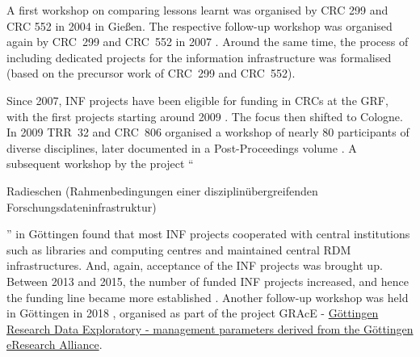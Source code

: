 \documentclass{eceasst}
\newenvironment{de}{\begin{otherlanguage}{ngerman}}{\end{otherlanguage}}
\begin{document}
A first workshop \cite{SFB299-2004, SFB299-2005} on comparing lessons learnt was organised by CRC 299 and CRC 552 in 2004 in Gießen.
The respective follow-up workshop was organised again by CRC~299 and CRC~552 in 2007 \cite{SFB299-2007}.
Around the same time, the process of including dedicated projects for the information infrastructure was formalised (based on the precursor work of CRC~299 and CRC~552).

Since 2007, INF projects have been eligible for funding in CRCs at the GRF, with the first projects starting around 2009 \cite{Forschungsdateninfrastruktur2013}.
The focus then shifted to Cologne. In 2009 TRR~32 and CRC~806 organised a workshop of nearly 80 participants of diverse disciplines, 
later documented in a Post-Proceedings volume \cite{curdt787}.
A subsequent workshop by the project ``\begin{de}Radieschen (Rahmenbedingungen einer disziplinübergreifenden Forschungsdateninfrastruktur)\end{de}'' 
in Göttingen \cite{Forschungsdateninfrastruktur2013} found that most INF projects cooperated with central institutions such as libraries and computing centres and maintained central RDM infrastructures.
And, again, acceptance of the INF projects was brought up.\\

Between 2013 and 2015, the number of funded INF projects increased, and hence the funding line became more established \cite{Engelhardt2013Forschungsdatenmanagement, bastian_2025}.
Another follow-up workshop was held in Göttingen in 2018 \cite{Roertgen2019},
organised as part of the project GRAcE  - \href{https://data.goettingen-research-online.de/dataverse/GRAcE}{Göttingen Research Data Exploratory - management parameters derived from the
Göttingen eResearch Alliance}.
\end{document}
